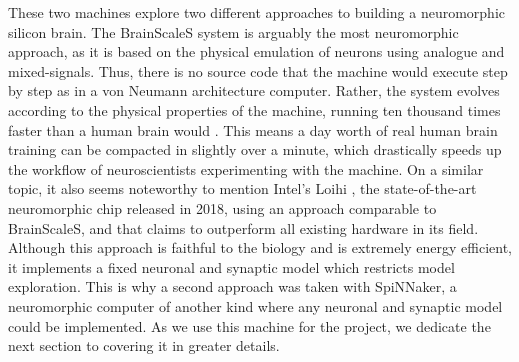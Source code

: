 These two machines explore two different approaches to building a neuromorphic silicon brain. The BrainScaleS system is arguably the most neuromorphic approach, as it is based on the physical emulation of neurons using analogue and mixed-signals. Thus, there is no source code that the machine would execute step by step as in a von Neumann architecture computer. Rather, the system evolves according to the physical properties of the machine, running ten thousand times faster than a human brain would \cite{hw}. This means a day worth of real human brain training can be compacted in slightly over a minute, which drastically speeds up the workflow of neuroscientists experimenting with the machine. On a similar topic, it also seems noteworthy to mention Intel's Loihi \cite{loihi}, the state-of-the-art neuromorphic chip released in 2018, using an approach comparable to BrainScaleS, and that claims to outperform all existing hardware in its field. \\

Although this approach is faithful to the biology and is extremely energy efficient, it implements a fixed neuronal and synaptic model which restricts model exploration. This is why a second approach was taken with SpiNNaker, a neuromorphic computer of another kind where any neuronal and synaptic model could be implemented. As we use this machine for the project, we dedicate the next section to covering it in greater details. \\


 


